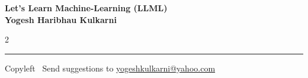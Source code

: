 \documentclass[8pt,landscape]{article}
\begin{document}
\footnotesize


\begin{center}
\Large{\textbf{Let's Learn Machine-Learning (LLML)\\ Yogesh Haribhau Kulkarni}}  
\end{center}

\begin{multicols}{2}

\end{multicols}

\rule{\linewidth}{0.25pt}
\scriptsize
Copyleft \textcopyleft\  Send suggestions to 
\href{http://www.yogeshkulkarni.com}{yogeshkulkarni@yahoo.com}
\end{document}
